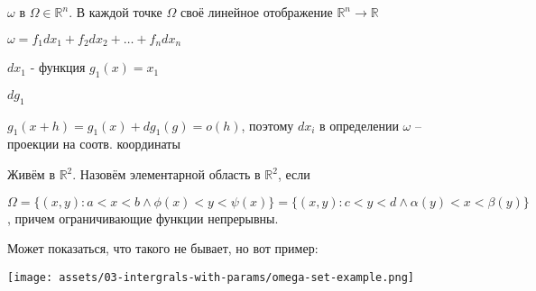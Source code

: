 \begin{remark}
    $\omega$ в $\Omega \in \mathbb{R}^n$. В каждой точке $\Omega$ своё линейное отображение $\mathbb{R}^n \to \mathbb{R}$

    $\omega = f_1dx_1 + f_2dx_2 + \dots + f_ndx_n$

    $dx_1$ - функция $g_1(x) = x_1$

    $dg_1$

    $g_1(x + h) = g_1(x) + dg_1(g) = o(h)$, поэтому $dx_i$ в определении $\omega$ -- проекции на соотв. координаты
\end{remark}

\begin{definition}
    Живём в $\mathbb{R}^2$. Назовём элементарной область в $\mathbb{R}^2$, если 

    $\Omega = \{ (x, y) : a < x < b \land \phi(x) < y < \psi(x) \} = \{ (x, y): c < y < d \land \alpha(y) < x < \beta(y) \}$, причем ограничивающие функции непрерывны.

    Может показаться, что такого не бывает, но вот пример: 
    
    \begin{center}
        \texttt{[image: assets/03-intergrals-with-params/omega-set-example.png]}
    \end{center}
\end{definition}

\newpage

